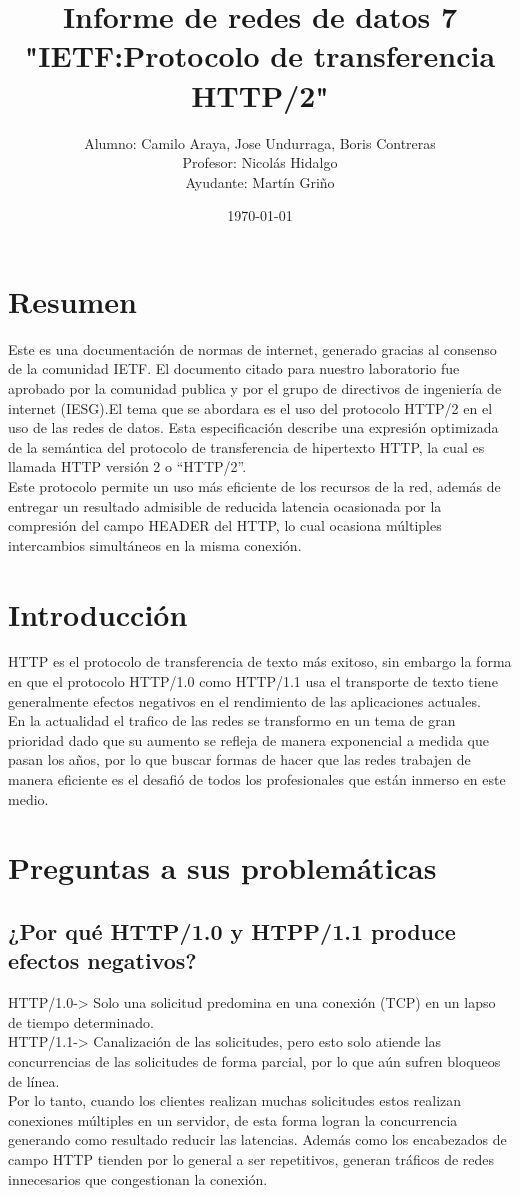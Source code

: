 \documentclass[spanish]{udpreport}
\title{Informe de redes de datos 7\\
"IETF:Protocolo de transferencia HTTP/2"\\}
\author{Alumno: Camilo Araya, Jose Undurraga, Boris Contreras
\\Profesor: Nicolás Hidalgo\\Ayudante: Martín Griño}
\date{\today}
\begin{document}
\maketitle

\chapter*{Resumen} 
Este es una documentación de normas de internet, generado gracias al consenso de la comunidad IETF. El documento citado para nuestro laboratorio fue aprobado por la comunidad publica y por el grupo de directivos de ingeniería de internet (IESG).El tema  que se abordara es el uso del protocolo HTTP/2 en el uso de las redes de datos. 
Esta especificación describe una expresión optimizada de la semántica del protocolo  de transferencia  de hipertexto HTTP, la cual es llamada HTTP versión 2 o “HTTP/2”. 
\\[0.2cm]
Este protocolo permite un uso más eficiente de los recursos de la red, además de entregar un resultado admisible de reducida latencia ocasionada por la compresión del campo HEADER  del HTTP, lo cual ocasiona múltiples intercambios simultáneos en la misma conexión.

\tableofcontents
\chapter{Introducción}
HTTP es el protocolo de transferencia de texto más exitoso, sin embargo la forma en que el protocolo HTTP/1.0 como HTTP/1.1 usa el transporte de texto tiene generalmente efectos negativos  en el rendimiento de las aplicaciones actuales.
\\[0.2cm]
En la actualidad el trafico de las redes se transformo en un tema de gran prioridad dado que su aumento se refleja de manera exponencial a medida que pasan los años, por lo que buscar formas de hacer que las redes trabajen de manera eficiente es el desafió de todos los profesionales que están inmerso en este medio.
\chapter{Preguntas a sus problemáticas}
\section{¿Por qué HTTP/1.0  y HTPP/1.1 produce efectos negativos?}
HTTP/1.0-> Solo una solicitud predomina en una conexión (TCP) en un lapso de tiempo determinado.
\\[0.2cm]
HTTP/1.1-> Canalización de las solicitudes, pero esto solo atiende las concurrencias de las solicitudes de forma parcial, por lo que aún sufren bloqueos de línea.
\\[0.2cm]
Por lo tanto, cuando los clientes realizan muchas solicitudes estos realizan conexiones múltiples en un servidor, de esta forma logran la concurrencia generando como resultado reducir las latencias. Además como los encabezados de campo HTTP tienden por lo general a ser repetitivos, generan  tráficos de redes innecesarios que congestionan la conexión.
\end{document}
